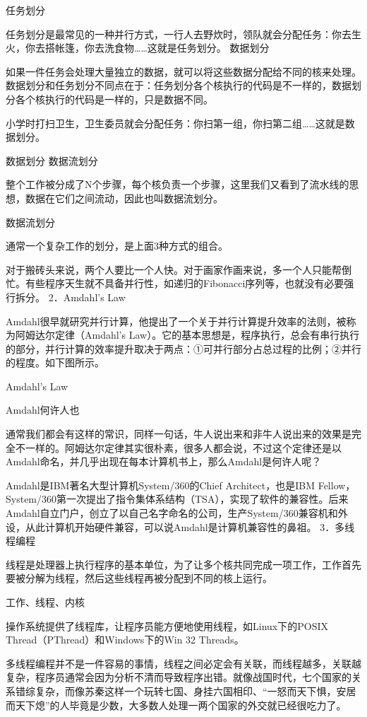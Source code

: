 \documentclass[12pt,UTF8]{ctexbook}
\begin{document}
任务划分

任务划分是最常见的一种并行方式，一行人去野炊时，领队就会分配任务：你去生火，你去搭帐篷，你去洗食物……这就是任务划分。
数据划分

如果一件任务会处理大量独立的数据，就可以将这些数据分配给不同的核来处理。数据划分和任务划分不同点在于：任务划分各个核执行的代码是不一样的，数据划分各个核执行的代码是一样的，只是数据不同。

小学时打扫卫生，卫生委员就会分配任务：你扫第一组，你扫第二组……这就是数据划分。

数据划分
数据流划分

整个工作被分成了N个步骤，每个核负责一个步骤，这里我们又看到了流水线的思想，数据在它们之间流动，因此也叫数据流划分。

数据流划分

通常一个复杂工作的划分，是上面3种方式的组合。

对于搬砖头来说，两个人要比一个人快。对于画家作画来说，多一个人只能帮倒忙。有些程序天生就不具备并行性，如递归的Fibonacci序列等，也就没有必要强行拆分。
2．Amdahl's Law

Amdahl很早就研究并行计算，他提出了一个关于并行计算提升效率的法则，被称为阿姆达尔定律（Amdahl's Law）。它的基本思想是，程序执行，总会有串行执行的部分，并行计算的效率提升取决于两点：①可并行部分占总过程的比例；②并行的程度。如下图所示。

Amdahl's Law

Amdahl何许人也

通常我们都会有这样的常识，同样一句话，牛人说出来和非牛人说出来的效果是完全不一样的。阿姆达尔定律其实很朴素，很多人都会说，不过这个定律还是以Amdahl命名，并几乎出现在每本计算机书上，那么Amdahl是何许人呢？

Amdahl是IBM著名大型计算机System/360的Chief Architect，也是IBM Fellow，System/360第一次提出了指令集体系结构（TSA），实现了软件的兼容性。后来Amdahl自立门户，创立了以自己名字命名的公司，生产System/360兼容机和外设，从此计算机开始硬件兼容，可以说Amdahl是计算机兼容性的鼻祖。
3．多线程编程

线程是处理器上执行程序的基本单位，为了让多个核共同完成一项工作，工作首先要被分解为线程，然后这些线程再被分配到不同的核上运行。

工作、线程、内核

操作系统提供了线程库，让程序员能方便地使用线程，如Linux下的POSIX Thread（PThread）和Windows下的Win 32 Threads。

多线程编程并不是一件容易的事情，线程之间必定会有关联，而线程越多，关联越复杂，程序员通常会因为分析不清而导致程序出错。就像战国时代，七个国家的关系错综复杂，而像苏秦这样一个玩转七国、身挂六国相印、“一怒而天下惧，安居而天下熄”的人毕竟是少数，大多数人处理一两个国家的外交就已经很吃力了。
\end{document}
